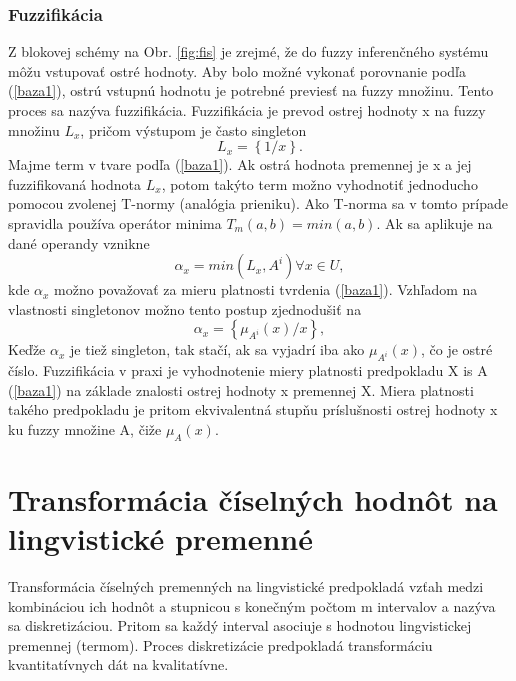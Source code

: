 \subsubsection{Fuzzifikácia}
Z blokovej schémy na Obr. \ref{fig:fis} je zrejmé, že do fuzzy inferenčného systému môžu vstupovať ostré hodnoty. Aby bolo možné vykonať porovnanie podľa (\ref{baza1}), ostrú vstupnú hodnotu je potrebné previesť na fuzzy množinu. Tento proces sa nazýva fuzzifikácia. Fuzzifikácia je prevod ostrej hodnoty x na fuzzy množinu $L_x$, pričom výstupom je často singleton \cite{gregorUI}
\begin{equation}\label{fuzzysingle1}
L_x = \left\lbrace1/x\right\rbrace .  
\end{equation}
Majme term v tvare podľa (\ref{baza1}). Ak ostrá hodnota premennej je x a jej fuzzifikovaná hodnota  $L_x$, potom takýto term možno vyhodnotiť jednoducho pomocou zvolenej T-normy (analógia prieniku). Ako T-norma sa v tomto prípade spravidla používa operátor minima  $T_m(a, b)=min(a, b)$. Ak sa aplikuje na dané operandy vznikne \cite{gregorUI}
\begin{equation}\label{fuzzimin}
\alpha_x = min(L_x, A^{i}) \forall x \in U, 
\end{equation}
kde $\alpha_x$ možno považovať za mieru platnosti tvrdenia (\ref{baza1}). 
Vzhľadom na vlastnosti singletonov možno tento postup zjednodušiť na 
\begin{equation}\label{fuzziminsingle}
\alpha_x = \left\lbrace \mu_{A^i}(x)/x\right\rbrace , 
\end{equation}
Keďže $\alpha_x$ je tiež singleton, tak stačí, ak sa vyjadrí iba ako $\mu_{A^i}(x)$, čo je ostré číslo. 
Fuzzifikácia v praxi je vyhodnotenie miery platnosti predpokladu X is A (\ref{baza1}) na základe znalosti ostrej hodnoty x premennej X. Miera platnosti takého predpokladu je pritom ekvivalentná stupňu príslušnosti ostrej hodnoty x ku fuzzy množine A, čiže  $\mu_{A}(x)$. \cite{gregorUI}  

\pagebreak








\pagebreak
\section{Transformácia číselných hodnôt na lingvistické premenné}
Transformácia číselných premenných na lingvistické predpokladá vzťah medzi kombináciou ich hodnôt a stupnicou s konečným počtom m intervalov a nazýva sa diskretizáciou. 
Pritom sa každý interval asociuje s hodnotou lingvistickej premennej (termom). Proces diskretizácie predpokladá transformáciu kvantitatívnych dát na kvalitatívne. \cite{levashenkoProj, Catlett1991}


